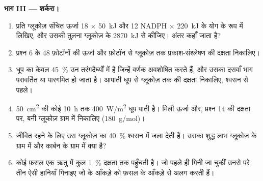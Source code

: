 \begin{problem}
\medskip
\noindent\textbf{भाग III --- शर्करा।}
\begin{enumerate}[resume]
  \item प्रति ग्लूकोज़ संचित ऊर्जा 18  $\times$
        \qty{50}{kJ} और 12 NADPH $\times$ \qty{220}{kJ} के योग के रूप
        में लिखिए, और उसकी तुलना ग्लूकोज़ के \qty{2870}{kJ} से कीजिए।
        अंतर कहाँ जाता है?
  \item प्रश्न 6 के 48 फ़ोटॉनों की ऊर्जा और फ़ोटॉन से ग्लूकोज़ तक
        प्रकाश-संश्लेषण की दक्षता निकालिए।
  \item धूप का केवल \qty{45}{\%} उन तरंगदैर्घ्यों में है जिन्हें वर्णक
        अवशोषित करते हैं, और उसका दसवाँ भाग परावर्तित या पारगमित हो
        जाता है। आपाती धूप से ग्लूकोज़ तक की दक्षता निकालिए, श्वसन से
        पहले।
  \item \qty{50}{cm^2} की कोई  \qty{10}{h} तक \qty{400}{W/m^2}
        धूप पाती है। मिली ऊर्जा और, प्रश्न 14 की दक्षता पर, बनी
        ग्लूकोज़ ग्राम में निकालिए (\qty{180}{g/mol})।
  \item {} जीवित रहने के लिए उस ग्लूकोज़ का \qty{40}{\%} श्वसन में
        जला देती है। उसका शुद्ध लाभ ग्लूकोज़ के ग्राम में और कार्बन के
        ग्राम में क्या है?
  \item कोई फ़सल एक ऋतु में कुल \qty{1}{\%} दक्षता तक पहुँचती है।
        जो पहले ही गिनी जा चुकीं उनसे परे तीन ऐसी हानियाँ गिनाइए जो
         के आँकड़े को फ़सल के आँकड़े से अलग करती हैं।
\end{enumerate}


\end{problem}
